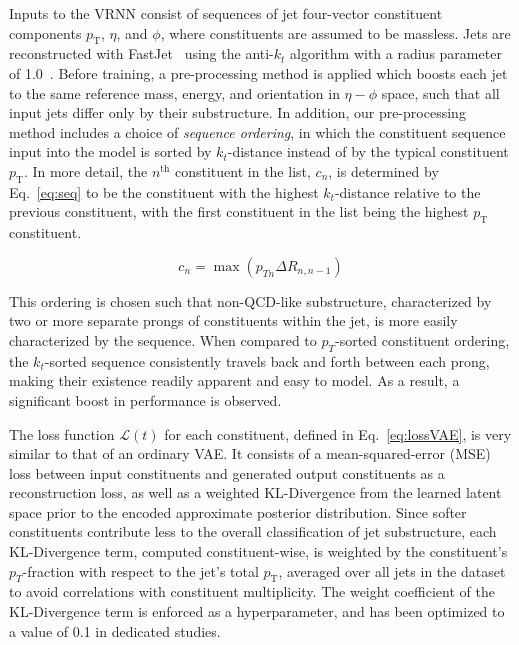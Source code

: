 \documentclass[a4paper,11pt]{article}
\begin{document}
Inputs to the VRNN consist of sequences of jet four-vector constituent components $p_\text{T}$, $\eta$, and $\phi$, where constituents are assumed to be massless.
Jets are reconstructed with FastJet~\cite{Cacciari:2011ma,Cacciari:2005hq} using the anti-$k_t$ algorithm with a radius parameter of 1.0~\cite{Cacciari:2008gp}.
Before training, a pre-processing method is applied which boosts each jet to the same reference mass, energy, and orientation in $\eta-\phi$ space, such that all input jets differ only by their substructure.
In addition, our pre-processing method includes a choice of \textit{sequence ordering}, in which the constituent sequence input into the model is sorted by $k_{t}$-distance instead of by the typical constituent $p_\text{T}$. 
In more detail, the $n^\text{th}$ constituent in the list, $c_{n}$, is determined by Eq.~\ref{eq:seq} to be the constituent with the highest $k_{t}$-distance relative to the previous constituent, with the first constituent in the list being the highest $p_\text{T}$ constituent. 

\begin{equation}
\label{eq:seq}
c_{n} = \max(p_{Tn}\Delta R_{n, n-1})
\end{equation}

This ordering is chosen such that non-QCD-like substructure, characterized by two or more separate prongs of constituents within the jet, is more easily characterized by the sequence. 
When compared to $p_{T}$-sorted constituent ordering, the $k_{t}$-sorted sequence consistently travels back and forth between each prong, making their existence readily apparent and easy to model. As a result, a significant boost in performance is observed.

The loss function $\mathcal{L}(t)$ for each constituent, defined in Eq.~\ref{eq:lossVAE}, is very similar to that of an ordinary VAE. 
It consists of a mean-squared-error (MSE) loss between input constituents and generated output constituents as a reconstruction loss, as well as a weighted KL-Divergence from the learned latent space prior to the encoded approximate posterior distribution. 
Since softer constituents contribute less to the overall classification of jet substructure, each KL-Divergence term, computed constituent-wise, is weighted by the constituent's $p_{T}$-fraction with respect to the jet's total $p_\text{T}$, averaged over all jets in the dataset to avoid correlations with constituent multiplicity. 
The weight coefficient of the KL-Divergence term is enforced as a hyperparameter, and has been optimized to a value of 0.1 in dedicated studies. 
\end{document}
